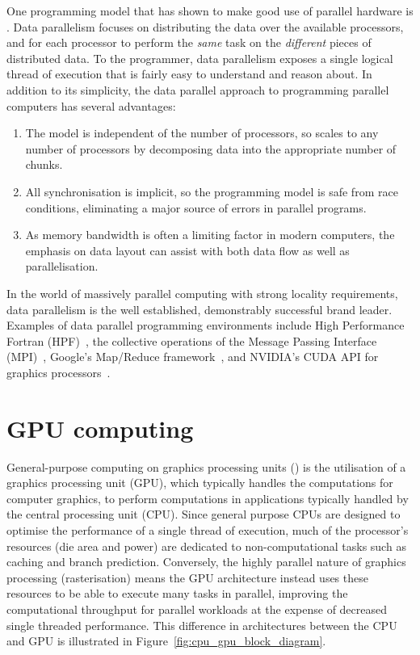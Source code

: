 One programming model that has shown to make good use of parallel hardware is
.
Data parallelism focuses on distributing the data over the available processors,
and for each processor to perform the \emph{same} task on the \emph{different}
pieces of distributed data. To the programmer, data parallelism exposes a single
logical thread of execution that is fairly easy to understand and reason about.
In addition to its simplicity, the data parallel approach to programming
parallel computers has several advantages:
%
\begin{enumerate}
\item The model is independent of the number of processors, so scales to any
    number of processors by decomposing data into the appropriate number of
    chunks.

\item All synchronisation is implicit, so the programming model is safe from
    race conditions, eliminating a major source of errors in parallel programs.

\item As memory bandwidth is often a limiting factor in modern computers, the
    emphasis on data layout can assist with both data flow as well as
    parallelisation.
\end{enumerate}
%
In the world of massively parallel computing with strong locality requirements,
data parallelism is the well established, demonstrably successful brand leader.
Examples of data parallel programming environments include High Performance
Fortran (HPF)~\cite{HPF:1997}, the collective operations of the Message Passing
Interface (MPI)~\cite{MPI:2012}, Google's Map/Reduce
framework~\cite{Dean:2008fi}, and NVIDIA's CUDA API for graphics
processors~\cite{NVIDIA:2012wf}.


\section{GPU computing} %
\label{sec:gpu_computing}

General-purpose computing on graphics processing units
() is the utilisation of a graphics processing unit (GPU),
which typically handles the computations for computer graphics, to perform
computations in applications typically handled by the central processing unit
(CPU). Since general purpose CPUs are designed to optimise the performance of a
single thread of execution, much of the processor's resources (die area and
power) are dedicated to non-computational tasks such as caching and branch
prediction. Conversely, the highly parallel nature of graphics processing
(rasterisation) means the GPU architecture instead uses these resources to be
able to execute many tasks in parallel, improving the computational throughput
for parallel workloads at the expense of decreased single threaded performance.
This difference in architectures between the CPU and GPU is illustrated in
Figure~\ref{fig:cpu_gpu_block_diagram}.


